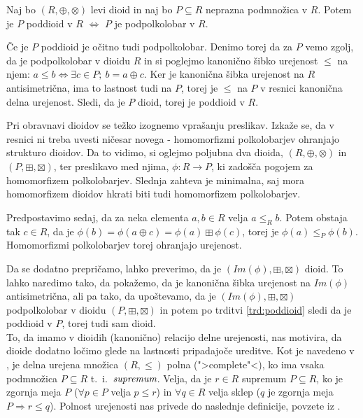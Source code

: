 \documentclass[mat1]{fmfdelo}
\newcommand{\pojem}[1]{\ensuremath{\emph{#1}}}
\newcommand{\map}[3]{\ensuremath{{#1}:{#2}\rightarrow{#3}}}
\begin{document}
\begin{trditev}
	\label{trd:poddioid}
	Naj bo $(R, \oplus, \otimes)$ levi dioid in naj bo $P\subseteq R$ neprazna podmnožica v $R$. Potem je $P$ poddioid v $R$ $\iff$ $P$ je podpolkolobar v $R$.
\end{trditev}

\begin{dokaz}
	Če je $P$ poddioid je očitno tudi podpolkolobar. Denimo torej da za $P$ vemo zgolj, da je podpolkolobar v dioidu $R$ in si poglejmo kanonično šibko urejenost $\leq$ na njem: $a\leq b\iff\exists c\in P;~b = a\oplus c$. Ker je kanonična šibka urejenost na $R$ antisimetrična, ima to lastnost tudi na $P$, torej je $\leq$ na $P$ v resnici kanonična delna urejenost. Sledi, da je $P$ dioid, torej je poddioid v $R$.
\end{dokaz}

Pri obravnavi dioidov se težko izognemo vprašanju preslikav. Izkaže se, da v resnici ni treba uvesti ničesar novega - homomorfizmi polkolobarjev ohranjajo strukturo dioidov. Da to vidimo, si oglejmo poljubna dva dioida, $(R, \oplus, \otimes)$ in $(P, \boxplus, \boxtimes)$, ter preslikavo med njima, $\map{\phi}{R}{P}$, ki zadošča pogojem za homomorfizem polkolobarjev. Slednja zahteva je minimalna, saj mora homomorfizem dioidov hkrati biti tudi homomorfizem polkolobarjev. 

Predpostavimo sedaj, da za neka elementa $a, b\in R$ velja $a\leq_R b$. Potem obstaja tak $c\in R$, da je $\phi(b) = \phi(a\oplus c) = \phi(a) \boxplus\phi(c)$, torej je $\phi(a) \leq_P\phi(b)$. Homomorfizmi polkolobarjev torej ohranjajo urejenost.

Da se dodatno prepričamo, lahko preverimo, da je $(Im(\phi), \boxplus, \boxtimes)$ dioid. To lahko naredimo tako, da pokažemo, da je kanonična šibka urejenost na $Im(\phi)$ antisimetrična, ali pa tako, da upoštevamo, da je $(Im(\phi), \boxplus, \boxtimes)$ podpolkolobar v dioidu $(P, \boxplus, \boxtimes)$ in potem po trditvi \ref{trd:poddioid} sledi da je poddioid v $P$, torej tudi sam dioid.
\newline \\
To, da imamo v dioidih (kanonično) relacijo delne urejenosti, nas motivira, da dioide dodatno ločimo glede na lastnosti pripadajoče ureditve. Kot je navedeno v \cite[str. 10]{bib:Gondran}, je delna urejena množica $(R, \leq)$ polna (">complete"<), ko ima vsaka podmnožica $P \subseteq R$ t.~i.~\pojem{supremum}. 
Velja, da je $r\in R$ supremum $P\subseteq R$, ko je zgornja meja $P$ ($\forall p \in P$ velja $ p \leq r$) in $\forall q \in R$ velja sklep ($q$ je zgornja meja $P \Rightarrow r \leq q$). Polnost urejenosti nas privede do naslednje definicije, povzete iz \cite[definicija 6.\,1.\,8.\,]{bib:Gondran}.
\end{document}
